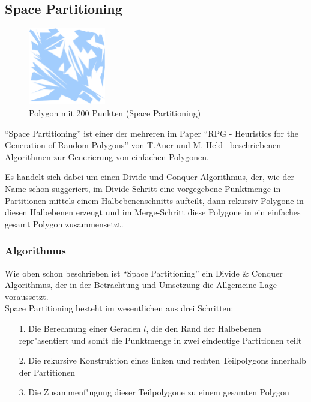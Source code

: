 
\subsection{Space Partitioning}

\begin{figure}[h]
\begin{center}
\includegraphics[width=0.3\textwidth]{img/spacepart200.eps}
\end{center}
\caption{Polygon mit 200 Punkten (Space Partitioning)}
\label{fig:icb14}
\end{figure}

``Space Partitioning'' ist einer der mehreren im Paper ``RPG - Heuristics for the
Generation of Random Polygons'' von T.Auer und M. Held~\cite{held98polygons}
beschriebenen Algorithmen zur Generierung von einfachen Polygonen.

Es handelt sich dabei um einen Divide und Conquer Algorithmus, der, wie der
Name schon suggeriert, im Divide-Schritt eine vorgegebene Punktmenge in
Partitionen mittels einem Halbebenenschnitts aufteilt, dann rekursiv Polygone
in diesen Halbebenen erzeugt und im Merge-Schritt diese Polygone in ein einfaches
gesamt Polygon zusammensetzt.

\subsubsection{Algorithmus}

Wie oben schon beschrieben ist ``Space Partitioning'' ein Divide \& Conquer Algorithmus,
der in der Betrachtung und Umsetzung die Allgemeine Lage voraussetzt. \\

\noindent
Space Partitioning besteht im wesentlichen aus drei Schritten:
\begin{itemize}
  \item[1.] Die Berechnung einer Geraden $l$, die den Rand der Halbebenen repr"asentiert
            und somit die Punktmenge in zwei eindeutige Partitionen teilt
  \item[2.] Die rekursive Konstruktion eines linken und rechten Teilpolygons innerhalb
            der Partitionen
  \item[3.] Die Zusammenf"ugung dieser Teilpolygone zu einem gesamten Polygon
\end{itemize}

